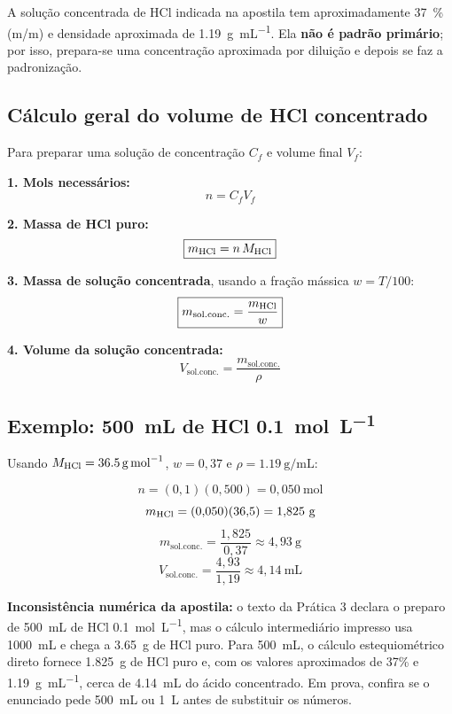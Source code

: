 \documentclass[a4paper,12pt]{article}
\begin{document}
A solução concentrada de HCl indicada na apostila tem aproximadamente \SI{37}{\percent} (m/m) e densidade aproximada de \SI{1.19}{\gram\per\milli\liter}. Ela \textbf{não é padrão primário}; por isso, prepara-se uma concentração aproximada por diluição e depois se faz a padronização.

\subsection{Cálculo geral do volume de HCl concentrado}

Para preparar uma solução de concentração $C_f$ e volume final $V_f$:

\begin{conta}
\textbf{1. Mols necessários:}
\[
\boxed{n=C_fV_f}
\]

\textbf{2. Massa de HCl puro:}
\[
\boxed{m_{\ce{HCl}}=n\,M_{\ce{HCl}}}
\]

\textbf{3. Massa de solução concentrada}, usando a fração mássica $w=T/100$:
\[
\boxed{m_{\mathrm{sol.conc.}}=\frac{m_{\ce{HCl}}}{w}}
\]

\textbf{4. Volume da solução concentrada:}
\[
\boxed{V_{\mathrm{sol.conc.}}=\frac{m_{\mathrm{sol.conc.}}}{\rho}}
\]
\end{conta}

\subsection{Exemplo: \SI{500}{\milli\liter} de HCl \SI{0.1}{\mole\per\liter}}

Usando $M_{\ce{HCl}}=\SI{36.5}{\gram\per\mole}$, $w=0{,}37$ e $\rho=\SI{1.19}{\gram\per\milli\liter}$:

\[
n=(0{,}1)(0{,}500)=0{,}050\ \mathrm{mol}
\]
\[
m_{\ce{HCl}}=(0{,}050)(36{,}5)=1{,}825\ \mathrm{g}
\]
\[
m_{\mathrm{sol.conc.}}=\frac{1{,}825}{0{,}37}\approx4{,}93\ \mathrm{g}
\]
\[
V_{\mathrm{sol.conc.}}=\frac{4{,}93}{1{,}19}\approx\boxed{4{,}14\ \mathrm{mL}}
\]

\begin{atencao}
\textbf{Inconsistência numérica da apostila:} o texto da Prática 3 declara o preparo de \SI{500}{\milli\liter} de HCl \SI{0.1}{\mole\per\liter}, mas o cálculo intermediário impresso usa \SI{1000}{\milli\liter} e chega a \SI{3.65}{\gram} de HCl puro. Para \SI{500}{\milli\liter}, o cálculo estequiométrico direto fornece \SI{1.825}{\gram} de HCl puro e, com os valores aproximados de 37\% e \SI{1.19}{\gram\per\milli\liter}, cerca de \SI{4.14}{\milli\liter} do ácido concentrado. Em prova, confira se o enunciado pede \SI{500}{\milli\liter} ou \SI{1}{\liter} antes de substituir os números.
\end{atencao}
\end{document}
